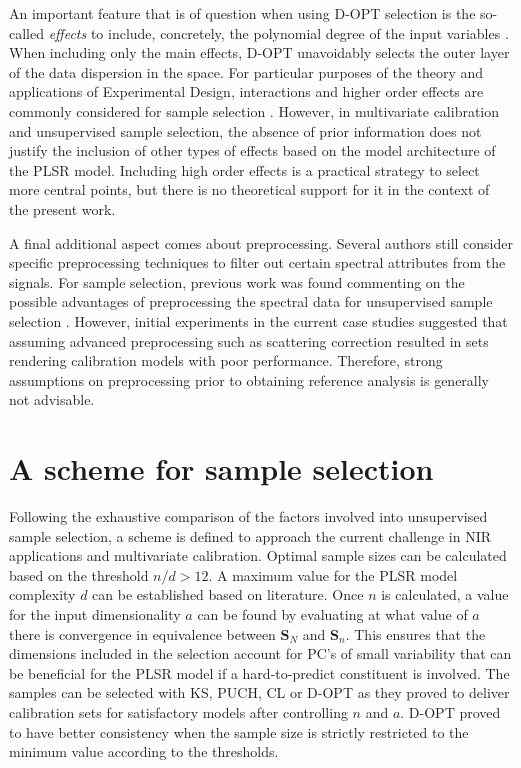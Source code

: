 \documentclass[journal=ancham,manuscript=article]{achemso}
\begin{document}
An important feature that is of question when using D-OPT selection is the so-called \emph{effects} to include, concretely, the polynomial degree of the input variables \cite{Goos2011}. When including only the main effects, D-OPT unavoidably selects the outer layer of the data dispersion in the space. For particular purposes of the theory and applications of Experimental Design, interactions and higher order effects are commonly considered for sample selection \cite{Brandmaier2012}. However, in multivariate calibration and unsupervised sample selection, the absence of prior information does not justify the inclusion of other types of effects based on the model architecture of the PLSR model. Including high order effects is a practical strategy to select more central points, but there is no theoretical support for it in the context of the present work.


A final additional aspect comes about preprocessing. Several authors still consider specific preprocessing techniques to filter out certain spectral attributes from the signals. For sample selection, previous work was found commenting on the possible advantages of preprocessing the spectral data for unsupervised sample selection \cite{Liu2019}. However, initial experiments in the current case studies suggested that assuming advanced preprocessing such as scattering correction resulted in sets rendering calibration models with poor performance. Therefore, strong assumptions on preprocessing prior to obtaining reference analysis is generally not advisable.



\section*{A scheme for sample selection}\label{scheme}

Following the exhaustive comparison of the factors involved into unsupervised sample selection, a scheme is defined to approach the current challenge in NIR applications and multivariate calibration. Optimal sample sizes can be calculated based on the threshold $n/d>12$. A maximum value for the PLSR model complexity $d$ can be established based on literature. Once $n$ is calculated, a value for the input dimensionality $a$ can be found by evaluating at what value of $a$ there is convergence in equivalence between $\mathbf{S}_N$ and $\mathbf{S}_n$. This ensures that the dimensions included in the selection account for PC's of small variability that can be beneficial for the PLSR model if a hard-to-predict constituent is involved. The samples can be selected with KS, PUCH, CL or D-OPT as they proved to deliver calibration sets for satisfactory models after controlling $n$ and $a$. D-OPT proved to have better consistency when the sample size is strictly restricted to the minimum value according to the thresholds. 
\end{document}
